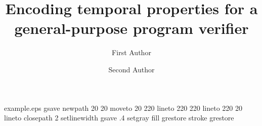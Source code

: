 %
%
%
%
%
\begin{filecontents*}{example.eps}
gsave
newpath
  20 20 moveto
  20 220 lineto
  220 220 lineto
  220 20 lineto
closepath
2 setlinewidth
gsave
  .4 setgray fill
grestore
stroke
grestore
\end{filecontents*}
%
\RequirePackage{fix-cm}
%
\documentclass[smallextended]{svjour3}       %
%
\smartqed  %
%
\usepackage{graphicx}
%
%
%
%
%


\title{Encoding temporal properties for a general-purpose program verifier%
}


\author{First Author         \and
        Second Author %
}



